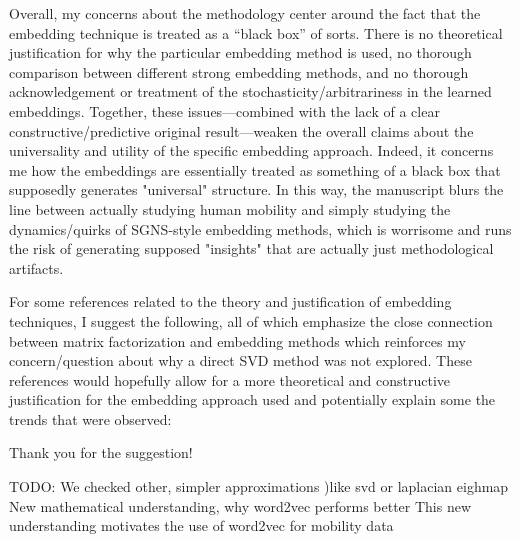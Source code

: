 \documentclass[12pt,a4paper]{article}
\newcommand{\response}[1]{{\leavevmode\noindent #1}}
\begin{document}
{Overall, my concerns about the methodology center around the fact that the embedding technique is treated as a “black box” of sorts. There is no theoretical justification for why the particular embedding method is used, no thorough comparison between different strong embedding methods, and no thorough acknowledgement or treatment of the stochasticity/arbitrariness in the learned embeddings. Together, these issues—combined with the lack of a clear constructive/predictive original result—weaken the overall claims about the universality and utility of the specific embedding approach. Indeed, it concerns me how the embeddings are essentially treated as something of a black box that supposedly generates "universal" structure. In this way, the manuscript blurs the line between actually studying human mobility and simply studying the dynamics/quirks of SGNS-style embedding methods, which is worrisome and runs the risk of generating supposed "insights" that are actually just
methodological artifacts.

For some references related to the theory and justification of embedding techniques, I suggest the following, all of which emphasize the close connection between matrix factorization and embedding methods which reinforces my concern/question about why a direct SVD method was not explored. These references would hopefully allow for a more theoretical and constructive justification for the embedding approach used and potentially explain some the trends that were observed:



}

\response{%
Thank you for the suggestion!

TODO:
We checked other, simpler approximations )like svd or laplacian eighmap
New mathematical understanding, why word2vec performs better
This new understanding motivates the use of word2vec for mobility data


}
\end{document}
